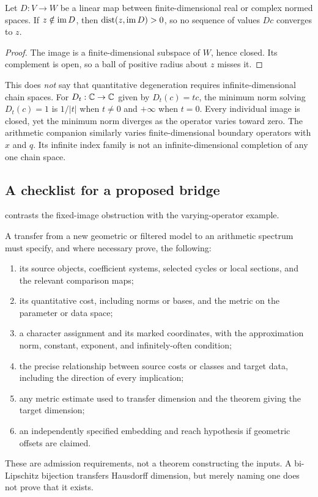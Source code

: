 \documentclass[11pt,a4paper]{article}
\begin{document}
\begin{proposition}
\label{prop:closed}
Let $D:V\to W$ be a linear map between finite-dimensional real or complex
normed spaces.  If $z\notin\operatorname{im} D$, then
$\operatorname{dist}(z,\operatorname{im} D)>0$, so no sequence of values $Dc$ converges to $z$.
\end{proposition}

\begin{proof}
The image is a finite-dimensional subspace of $W$, hence closed.  Its
complement is open, so a ball of positive radius about $z$ misses it.
\end{proof}

This does \emph{not} say that quantitative degeneration requires
infinite-dimensional chain spaces.  For $D_t:\mathbb C\to\mathbb C$ given by
$D_t(c)=tc$, the minimum norm solving $D_t(c)=1$ is $1/|t|$ when
$t\ne0$ and $+\infty$ when $t=0$.  Every individual image is closed,
yet the minimum norm diverges as the operator varies toward zero.
The arithmetic companion similarly varies finite-dimensional boundary
operators with $x$ and $q$.  Its infinite index family is not an
infinite-dimensional completion of any one chain space.

\subsection{A checklist for a proposed bridge}

 contrasts the fixed-image obstruction
with the varying-operator example.


A transfer from a new geometric or filtered model to an arithmetic
spectrum must specify, and where necessary prove, the following:
\begin{enumerate}
 \item its source objects, coefficient systems, selected cycles or local
 sections, and the relevant comparison maps;
 \item its quantitative cost, including norms or bases, and the metric
 on the parameter or data space;
 \item a character assignment and its marked coordinates, with the
 approximation norm, constant, exponent, and infinitely-often condition;
 \item the precise relationship between source costs or classes and
 target data, including the direction of every implication;
 \item any metric estimate used to transfer dimension and the theorem
 giving the target dimension;
 \item an independently specified embedding and reach hypothesis if
 geometric offsets are claimed.
\end{enumerate}
These are admission requirements, not a theorem constructing the inputs.
A bi-Lipschitz bijection transfers Hausdorff dimension, but merely naming
one does not prove that it exists.
\end{document}
